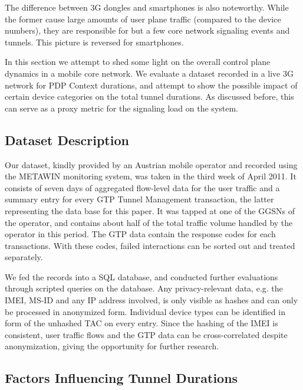 The difference between 3G dongles and smartphones is also noteworthy. While the former cause large amounts of user plane traffic (compared to the device numbers), they are responsible for but a few core network signaling events and tunnels. This picture is reversed for smartphones.




In this section we attempt to shed some light on the overall control plane dynamics in a mobile core network. We evaluate a dataset recorded in a live 3G network for PDP Context durations, and attempt to show the possible impact of certain device categories on the total tunnel durations. As discussed before, this can serve as a proxy metric for the signaling load on the system. 


\subsection{Dataset Description}
Our dataset, kindly provided by an Austrian mobile operator and recorded using the \gls{METAWIN} monitoring system, was taken in the third week of April 2011. It consists of seven days of aggregated flow-level data for the user traffic and a summary entry for every \gls{GTP} Tunnel Management transaction, the latter representing the data base for this paper. It was tapped at one of the \glspl{GGSN} of the operator, and contains about half of the total traffic volume handled by the operator in this period. The \gls{GTP} data contain the response codes for each transactions. With these codes, failed interactions can be sorted out and treated separately.

We fed the records into a SQL database, and conducted further evaluations through scripted queries on the database. Any privacy-relevant data, e.g. the \gls{IMEI}, \gls{MS-ID} and any IP address involved, is only visible as hashes and can only be processed in anonymized form. Individual device types can be identified in form of the unhashed \gls{TAC} on every entry. Since the hashing of the \gls{IMEI} is consistent, user traffic flows and the \gls{GTP} data can be cross-correlated despite anonymization, giving the opportunity for further research.

 

\subsection{Factors Influencing Tunnel Durations}

